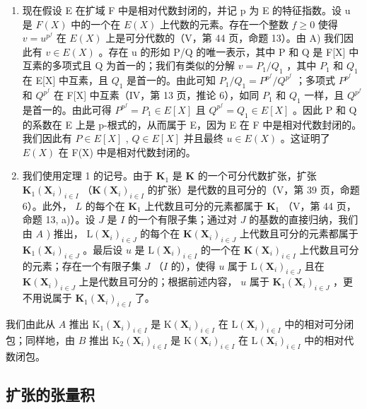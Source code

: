 \begin{enumerate}
\def\labelenumi{\Alph{enumi})}
\setcounter{enumi}{1}
\item
  现在假设 E 在扩域 F 中是相对代数封闭的，并记 p 为 E 的特征指数。设 u 是 \(F(X)\) 中的一个在 \(E(X)\) 上代数的元素。存在一个整数 \(f \geqslant 0\) 使得 \(v = u^{p^f}\) 在 \(E(X)\) 上是可分代数的（V，第 44 页，命题 13）。由 A) 我们因此有 \(v \in E(X)\) 。存在 u 的形如 P/Q 的唯一表示，其中 P 和 Q 是 F{[}X{]} 中互素的多项式且 Q 为首一的；我们有类似的分解 \(v = P_1 / Q_1\) ，其中 \(P_1\) 和 \(Q_1\) 在 E{[}X{]} 中互素，且 \(Q_1\) 是首一的。由此可知 \(P_1 / Q_1 = P^{p^f} / Q^{p^f}\) ；多项式 \(P^{p^f}\) 和 \(Q^{p^f}\) 在 F{[}X{]} 中互素（IV，第 13 页，推论 6），如同 \(P_1\) 和 \(Q_1\) 一样，且 \(Q^{p^f}\) 是首一的。由此可得 \(P^{p^f} = P_1 \in E[X]\) 且 \(Q^{p^f} = Q_1 \in E[X]\) 。因此 P 和 Q 的系数在 E 上是 p-根式的，从而属于 E，因为 E 在 F 中是相对代数封闭的。我们因此有 \(P \in E[X]\) , \(Q \in E[X]\) 并且最终 \(u \in E(X)\) 。这证明了 \(E(X)\) 在 F(X) 中是相对代数封闭的。
\item
  我们使用定理 1 的记号。由于 \(\mathbf{K}_1\) 是 \(\mathbf{K}\) 的一个可分代数扩张，扩张 \(\mathbf{K}_1(\mathbf{X}_i)_{i\in I}\) （\(\mathbf{K}(\mathbf{X}_i)_{i\in I}\) 的扩张）是代数的且可分的（V，第 39 页，命题 6）。此外， \(L\) 的每个在 \(\mathbf{K}_1\) 上代数且可分的元素都属于 \(\mathbf{K}_1\) （V，第 44 页，命题 13, a)）。设 \(J\) 是 \(I\) 的一个有限子集；通过对 \(J\) 的基数的直接归纳，我们由 \(A\) ) 推出， \(\mathrm{L}(\mathbf{X}_i)_{i\in J}\) 的每个在 \(\mathbf{K}(\mathbf{X}_i)_{i\in J}\) 上代数且可分的元素都属于 \(\mathbf{K}_1(\mathbf{X}_i)_{i\in J}\) 。最后设 \(u\) 是 \(\mathrm{L}(\mathbf{X}_i)_{i\in I}\) 的一个在 \(\mathbf{K}(\mathbf{X}_i)_{i\in I}\) 上代数且可分的元素；存在一个有限子集 \(J\) （\(I\) 的），使得 \(u\) 属于 \(\mathrm{L}(\mathbf{X}_i)_{i\in J}\) 且在 \(\mathbf{K}(\mathbf{X}_i)_{i\in J}\) 上是代数且可分的；根据前述内容， \(u\) 属于 \(\mathbf{K}_1(\mathbf{X}_i)_{i\in J}\) ，更不用说属于 \(\mathbf{K}_1(\mathbf{X}_i)_{i\in I}\) 了。
\end{enumerate}

我们由此从 \(A\) 推出 \(\mathrm{K}_1(\mathbf{X}_i)_{i\in I}\) 是 \(\mathrm{K}(\mathbf{X}_i)_{i\in I}\) 在 \(\mathrm{L}(\mathbf{X}_i)_{i\in I}\) 中的相对可分闭包；同样地，由 \(B\) 推出 \(\mathrm{K}_2(\mathbf{X}_i)_{i\in I}\) 是 \(\mathrm{K}(\mathbf{X}_i)_{i\in I}\) 在 \(\mathrm{L}(\mathbf{X}_i)_{i\in I}\) 中的相对代数闭包。

\subsection{扩张的张量积}

